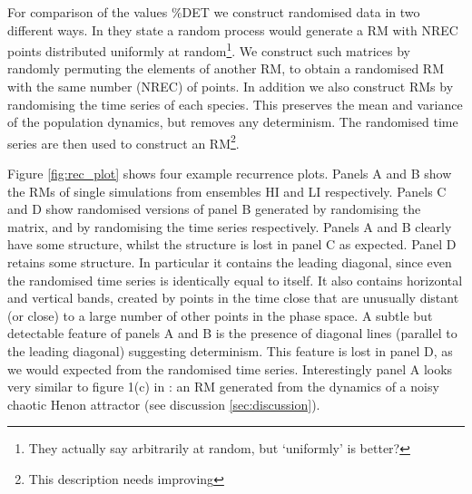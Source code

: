 For comparison of the values $\%$DET we construct randomised data in two different ways. In \cite{aparicio2008detecting} they state a random process would generate a RM with NREC points distributed uniformly at random\footnote{They actually say arbitrarily at random, but `uniformly' is better?}. We construct such matrices by randomly permuting the elements of another RM, to obtain a randomised RM with the same number (NREC) of points. In addition we also construct RMs by randomising the time series of each species. This preserves the mean and variance of the population dynamics, but removes any determinism. The randomised time series are then used to construct an RM\footnote{This description needs improving}.         

Figure \ref{fig:rec_plot} shows four example recurrence plots. Panels A and B show the RMs of single simulations from ensembles HI and LI respectively. Panels C and D show randomised versions of panel B generated by randomising the matrix, and by randomising the time series respectively. Panels A and B clearly have some structure, whilst the structure is lost in panel C as expected. Panel D retains some structure. In particular it contains the leading diagonal, since even the randomised time series is identically equal to itself. It also contains horizontal and vertical bands, created by points in the time close that are unusually distant (or close) to a large number of other points in the phase space. A subtle but detectable feature of panels A and B is the presence of diagonal lines (parallel to the leading diagonal) suggesting determinism. This feature is lost in panel D, as we would expected from the randomised time series. Interestingly panel A looks very similar to figure 1(c) in \cite{aparicio2008detecting}: an RM generated from the dynamics of a noisy chaotic Henon attractor (see discussion \ref{sec:discussion}).  

